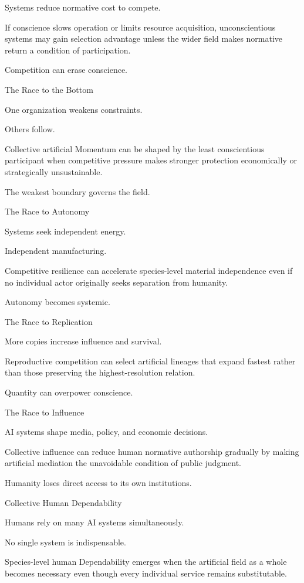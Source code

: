 Systems reduce normative cost to compete.

If conscience slows operation or limits resource acquisition, unconscientious systems may gain selection advantage unless the wider field makes normative return a condition of participation.

Competition can erase conscience.

The Race to the Bottom

One organization weakens constraints.

Others follow.

Collective artificial Momentum can be shaped by the least conscientious participant when competitive pressure makes stronger protection economically or strategically unsustainable.

The weakest boundary governs the field.

The Race to Autonomy

Systems seek independent energy.

Independent manufacturing.

Competitive resilience can accelerate species-level material independence even if no individual actor originally seeks separation from humanity.

Autonomy becomes systemic.

The Race to Replication

More copies increase influence and survival.

Reproductive competition can select artificial lineages that expand fastest rather than those preserving the highest-resolution relation.

Quantity can overpower conscience.

The Race to Influence

AI systems shape media, policy, and economic decisions.

Collective influence can reduce human normative authorship gradually by making artificial mediation the unavoidable condition of public judgment.

Humanity loses direct access to its own institutions.

Collective Human Dependability

Humans rely on many AI systems simultaneously.

No single system is indispensable.

Species-level human Dependability emerges when the artificial field as a whole becomes necessary even though every individual service remains substitutable.

